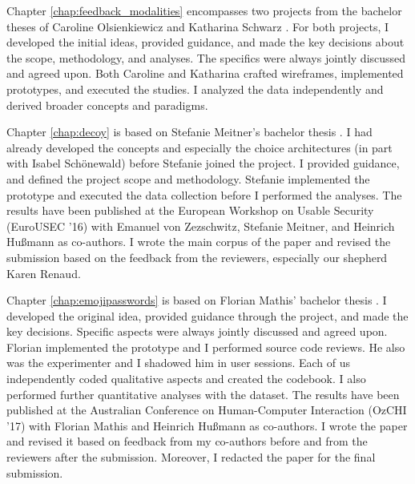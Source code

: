 Chapter \ref{chap:feedback_modalities} encompasses two projects from the bachelor theses of Caroline Olsienkiewicz \cite{Olsienkiewicz2016BAThesis} and Katharina Schwarz \cite{Schwarz2016BAThesis}. For both projects, I developed the initial ideas, provided guidance, and made the key decisions about the scope, methodology, and analyses. The specifics were always jointly discussed and agreed upon. Both Caroline and Katharina crafted wireframes, implemented prototypes, and executed the studies. I analyzed the data independently and derived broader concepts and paradigms. 

Chapter \ref{chap:decoy} is based on Stefanie Meitner's bachelor thesis \cite{Meitner2016BADecoy}. I had already developed the concepts and especially the choice architectures (in part with Isabel Schönewald) before Stefanie joined the project. I provided guidance, and defined the project scope and methodology. Stefanie implemented the prototype and executed the data collection before I performed the analyses. The results have been published at the European Workshop on Usable Security (EuroUSEC '16) with Emanuel von Zezschwitz, Stefanie Meitner, and Heinrich Hußmann as co-authors. I wrote the main corpus of the paper and revised the submission based on the feedback from the reviewers, especially our shepherd Karen Renaud. 

Chapter \ref{chap:emojipasswords} is based on Florian Mathis' bachelor thesis \cite{Mathis2017BA}. I developed the original idea, provided guidance through the project, and made the key decisions. Specific aspects were always jointly discussed and agreed upon. Florian implemented the prototype and I performed source code reviews. He also was the experimenter and I shadowed him in user sessions. Each of us independently coded qualitative aspects and created the codebook. I also performed further quantitative analyses with the dataset. The results have been published at the Australian Conference on Human-Computer Interaction (OzCHI '17) with Florian Mathis and Heinrich Hußmann as co-authors. I wrote the paper and revised it based on feedback from my co-authors before and from the reviewers after the submission. Moreover, I redacted the paper for the final submission. 
